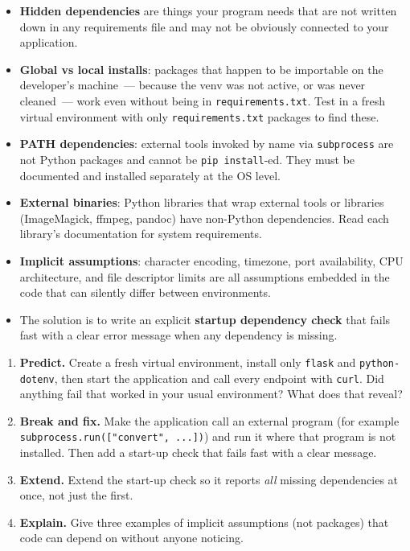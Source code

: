 \label{08-hidden-dependencies:key-takeaways}
\begin{takeaways}

\begin{itemize}
\tightlist
\item
  \textbf{Hidden dependencies} are things your program needs that are not written down in any requirements file and may not be obviously connected to your application.
\item
  \textbf{Global vs local installs}: packages that happen to be importable on the developer's machine~--- because the venv was not active, or was never cleaned~--- work even without being in \texttt{requirements.txt}. Test in a fresh virtual environment with only \texttt{requirements.txt} packages to find these.
\item
  \textbf{PATH dependencies}: external tools invoked by name via \texttt{subprocess} are not Python packages and cannot be \texttt{pip\ install}-ed. They must be documented and installed separately at the OS level.
\item
  \textbf{External binaries}: Python libraries that wrap external tools or libraries (ImageMagick, ffmpeg, pandoc) have non-Python dependencies. Read each library's documentation for system requirements.
\item
  \textbf{Implicit assumptions}: character encoding, timezone, port availability, CPU architecture, and file descriptor limits are all assumptions embedded in the code that can silently differ between environments.
\item
  The solution is to write an explicit \textbf{startup dependency check} that fails fast with a clear error message when any dependency is missing.
\end{itemize}

\end{takeaways}

\label{08-hidden-dependencies:exercises}

\begin{enumerate}
\def\labelenumi{\arabic{enumi}.}
\tightlist
\item
  \textbf{Predict.} Create a fresh virtual environment, install only \texttt{flask} and \texttt{python-dotenv}, then start the application and call every endpoint with \texttt{curl}. Did anything fail that worked in your usual environment? What does that reveal?
\item
  \textbf{Break and fix.} Make the application call an external program (for example \texttt{subprocess.}\allowbreak{}\texttt{run({[}"convert",}\allowbreak{}\texttt{\ .}\allowbreak{}\texttt{.}\allowbreak{}\texttt{.}\allowbreak{}\texttt{{]})}) and run it where that program is not installed. Then add a start-up check that fails fast with a clear message.
\item
  \textbf{Extend.} Extend the start-up check so it reports \emph{all} missing dependencies at once, not just the first.
\item
  \textbf{Explain.} Give three examples of implicit assumptions (not packages) that code can depend on without anyone noticing.
\end{enumerate}

